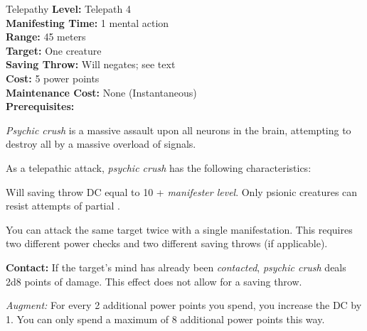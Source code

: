 {Telepathy}
{
	\textbf{Level:}
	Telepath 4\\
	\textbf{Manifesting Time:}
	1 mental action\\
	\textbf{Range:}
	45 meters\\
	\textbf{Target:}
	One creature\\
	\textbf{Saving Throw:}
	Will negates; see text\\
	\textbf{Cost:}
	5 power points\\
	\textbf{Maintenance Cost:}
	None (Instantaneous)\\
	\textbf{Prerequisites:}
	\\
}
{
	\emph{Psychic crush} is a massive assault upon all neurons in the brain, attempting to destroy all by a massive overload of signals.

	As a telepathic attack, \emph{psychic crush} has the following characteristics:
	\begin{itemize*}
		\item Will saving throw DC equal to 10 + \textit{manifester level}. Only psionic creatures can resist attempts of partial .
		\item You can attack the same target twice with a single manifestation. This requires two different power checks and two different saving throws (if applicable).
	\end{itemize*}

	\textbf{Contact:} If the target's mind has already been \emph{contacted}, \emph{psychic crush} deals 2d8 points of damage. This effect does not allow for a saving throw.

	\textit{Augment:} For every 2 additional power points you spend, you increase the DC by 1. You can only spend a maximum of 8 additional power points this way.
}
